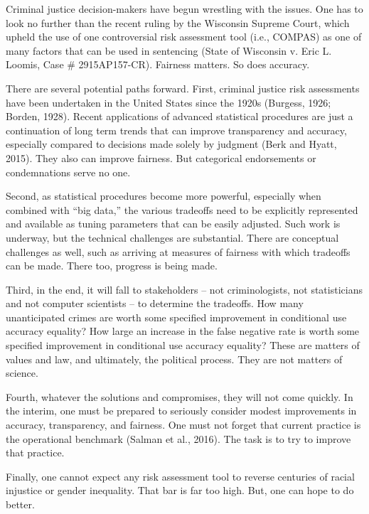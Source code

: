 \documentclass[12pt]{article}
\begin{document}
Criminal justice decision-makers have begun wrestling with the issues. One has to look no further than the recent ruling by the Wisconsin Supreme Court, which upheld the use of one controversial risk assessment tool (i.e., COMPAS) as one of many factors that can be used in sentencing (State of Wisconsin v. Eric L. Loomis, Case \# 2915AP157-CR). Fairness matters. So does accuracy. 

There are several potential paths forward. First, criminal justice risk assessments have been undertaken in the United States since the 1920s (Burgess, 1926; Borden, 1928). Recent applications of advanced statistical procedures are just a continuation of long term trends that can improve transparency and accuracy, especially compared to decisions made solely by judgment (Berk and Hyatt, 2015). They also can improve fairness.  But categorical endorsements or condemnations serve no one.   

Second, as statistical procedures become more powerful, especially when combined with ``big data,'' the various tradeoffs need to be explicitly represented and available as tuning parameters that can be easily adjusted. Such work is underway, but the technical challenges are substantial. There are conceptual challenges as well, such as arriving at measures of fairness with which tradeoffs can be made. There too, progress is being made.

Third, in the end, it will fall to stakeholders --  not criminologists, not statisticians and not computer scientists -- to determine the tradeoffs. How many unanticipated crimes are worth some specified improvement in conditional use accuracy equality? How large an increase in the false negative rate is worth some specified improvement in conditional use accuracy equality? These are matters of values and law, and ultimately, the political process. They are not matters of science. 

Fourth, whatever the solutions and compromises, they will not come quickly. In the interim, one must be prepared to seriously consider modest improvements in accuracy, transparency, and fairness. One must not forget that current practice is the operational benchmark (Salman et al., 2016). The task is to try to improve that practice.

Finally, one cannot expect any risk assessment tool to reverse centuries of racial injustice or gender inequality. That bar is far too high. But, one can hope to do better. 

\pagebreak
\end{document}
